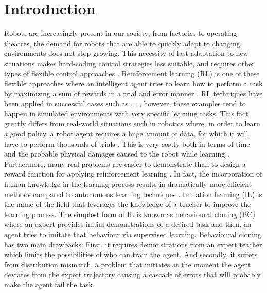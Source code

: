 \chapter{Introduction}
\label{chapter:introduction}

Robots are increasingly present in our society; from factories to operating theatres, the demand for robots that are able to quickly adapt to changing environments does not stop growing. This necessity of fast adaptation to new situations makes hard-coding control strategies less suitable, and requires other types of flexible control approaches \cite{need-of-flexible-control-approaches}. Reinforcement learning (RL) is one of these flexible approaches where an intelligent agent tries to learn how to perform a task by maximizing a sum of rewards in a trial and error manner \cite{Sutton:1998}. RL techniques have been applied in successful cases such as \cite{Atari-RL}, \cite{alphaGO-silver-2016}, \cite{openAI-hand}, however, these examples tend to happen in simulated environments with very specific learning tasks. This fact greatly differs from real-world situations such in robotics where, in order to learn a good policy, a robot agent requires a huge amount of data, for which it will have to perform thousands of trials  \cite{reinforcement-learning-costly-Kober:2013}. This is very costly both in terms of time and the probable physical damages caused to the robot while learning \cite{TAMER-Knox-Stone:2009}. Furthermore, many real problems are easier to demonstrate than to design a reward function for applying reinforcement learning \cite{kostrikov2019imitation}. In fact, the incorporation of human knowledge in the learning process results in dramatically more efficient methods compared to autonomous learning techniques \cite{Global-overview-Attia:2018}. Imitation learning (IL) is the name of the field that leverages the knowledge of a teacher to improve the learning process. The simplest form of IL is known as behavioural cloning (BC) where an expert provides initial demonstrations of a desired task and then, an agent tries to imitate that behaviour via supervised learning.  Behavioural cloning has two main drawbacks: First, it requires demonstrations from an expert teacher which limits the possibilities of who can train the agent. And secondly, it suffers from distribution mismatch, a problem that initiates at the moment the agent deviates from the expert trajectory causing a cascade of errors that will probably make the agent fail the task.

\setlength{\parskip}{1em}

